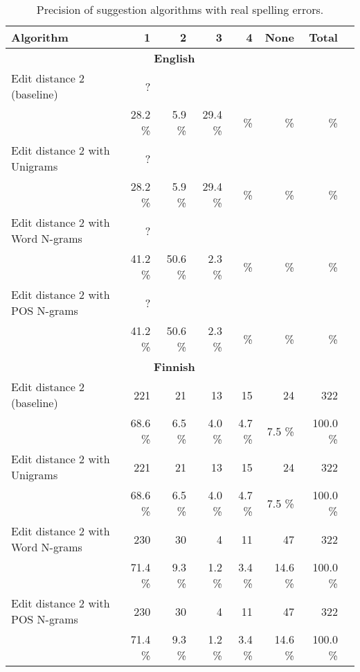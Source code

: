 \documentclass{llncs}
\begin{document}
\begin{table*}
    \caption{Precision of suggestion algorithms with real spelling errors.
    \label{table:real-eval}}
  \begin{center}
      \begin{tabular}{lrrrrrrr}
        \hline
        Algorithm & 1 & 2 & 3 & 4 & None & Total \\
        \hline
        \multicolumn{7}{c}{\textbf{English}} \\
        \hline
        Edit distance 2 (baseline) 
&    ?   &       &      &      &       &     \\
& 28.2 \% & 5.9 \% & 29.4 \% &     \% &     \%  &       \% \\
        \hline
        Edit distance 2 with Unigrams 
&    ?   &       &      &      &       &     \\
& 28.2 \% & 5.9 \% & 29.4 \% &     \% &     \%  &       \% \\
        \hline
        Edit distance 2 with Word N-grams 
&     ?  &       &      &      &       &     \\
& 41.2 \% & 50.6 \% & 2.3 \% &     \% &      \% &       \% \\
        \hline
        Edit distance 2 with POS N-grams 
&     ?  &       &      &      &       &     \\
& 41.2 \% & 50.6 \% & 2.3 \% &     \% &      \% &       \% \\
\hline
        \multicolumn{7}{c}{\textbf{Finnish}} \\
        \hline
        Edit distance 2 (baseline)
& 221    & 21    & 13    & 15    & 24    & 322 \\
& 68.6 \% & 6.5 \% & 4.0 \% & 4.7 \% & 7.5 \% & 100.0 \% \\
        \hline
        Edit distance 2 with Unigrams 
& 221    & 21    & 13    & 15    & 24    & 322 \\
& 68.6 \% & 6.5 \% & 4.0 \% & 4.7 \% & 7.5 \% & 100.0 \% \\

        \hline
        Edit distance 2 with Word N-grams
& 230    & 30    & 4    & 11    & 47    & 322 \\
& 71.4 \% & 9.3 \% & 1.2 \% & 3.4 \% & 14.6 \% & 100.0 \% \\
        \hline
        Edit distance 2 with POS N-grams
& 230    & 30    & 4    & 11    & 47    & 322 \\
& 71.4 \% & 9.3 \% & 1.2 \% & 3.4 \% & 14.6 \% & 100.0 \% \\
        \hline
      \end{tabular}
  \end{center}
\end{table*}
\end{document}
